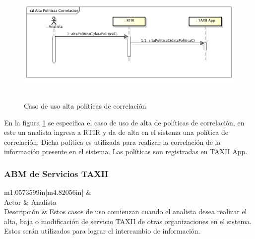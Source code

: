 \bigskip
\begin{figure}[ht!]
	\centering
	\includegraphics[width=5.7638in,height=2.2535in]{Analisis22-img/Analisis22-img022.png} 
	\caption{Caso de uso alta políticas de correlación}
	\label{fig.altacorrelacion}
\end{figure}
{
	En la figura \ref{fig.altacorrelacion} se especifica el caso de uso de alta de políticas de correlación, en este un analista ingresa a RTIR y
	da de alta en el sistema una política de correlación. Dicha política es utilizada para realizar la correlación de la
	información presente en el sistema. Las políticas son registradas en TAXII App.}


\newpage

\subsubsection{ABM de Servicios TAXII}

\bigskip

\begin{flushleft}
	\tablefirsthead{}
	\tablehead{}
	\tabletail{}
	\tablelasttail{}
	\begin{supertabular}{m{1.0573599in}|m{4.82056in}|}
		 &
		\\\hline
		{ Actor} &
		{ Analista}\\
		{ Descripción} &
		{ Estos casos de uso comienzan cuando el analista desea realizar el alta, baja o
			modificación de servicio TAXII de otras organizaciones en el sistema. Estos serán utilizados para lograr el intercambio
			de información.}\\\hhline{~-}
	\end{supertabular}
\end{flushleft}

